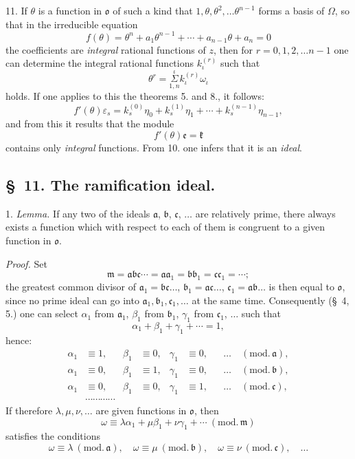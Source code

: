 \documentclass{article}
\begin{document}

11. If $\theta$ is a function in $\mathfrak{o}$ of such a kind that $1, \theta, \theta^{2}, \ldots \theta^{n-1}$ forms a basis of $\Omega$, so that in the irreducible equation
\[ f(\theta) = \theta^{n} + a_{1}\theta^{n-1} + \cdots + a_{n-1}\theta + a_{n} = 0 \]
the coefficients are \emph{integral} rational functions of $z$, then for $r = 0, 1, 2, \ldots n-1$ one can determine the integral rational functions $k_{\iota}^{(r)}$ such that
\[ \theta^{r} = \overset{\iota}{\underset{1,n}{\Sigma}} k_{\iota}^{(r)}\omega_{\iota} \]
holds. If one applies to this the theorems 5. and 8., it follows:
\[ f'(\theta)\varepsilon_{s} = k_{s}^{(0)}\eta_{0} + k_{s}^{(1)}\eta_{1} + \cdots + k_{s}^{(n-1)}\eta_{n-1}, \]
and from this it results that the module
\[ f'(\theta)\mathfrak{e} = \mathfrak{k} \]
contains only \emph{integral} functions. From 10. one infers that it is an \emph{ideal}.

\subsection*{§~11. The ramification ideal.}

1. \emph{Lemma.} If any two of the ideals $\mathfrak{a}$, $\mathfrak{b}$, $\mathfrak{c}$, $\ldots$ are relatively prime, there always exists a function which with respect to each of them is congruent to a given function in $\mathfrak{o}$.

\emph{Proof.} Set
\[ \mathfrak{m} = \mathfrak{a}\mathfrak{b}\mathfrak{c}\cdots = \mathfrak{a}\mathfrak{a}_{1} = \mathfrak{b}\mathfrak{b}_{1} = \mathfrak{c}\mathfrak{c}_{1} = \cdots; \]
the greatest common divisor of $\mathfrak{a}_{1} = \mathfrak{b}\mathfrak{c}\ldots$, $\mathfrak{b}_{1} = \mathfrak{a}\mathfrak{c}\ldots$, $\mathfrak{c}_{1} = \mathfrak{a}\mathfrak{b}\ldots$ is then equal to $\mathfrak{o}$, since no prime ideal can go into $\mathfrak{a}_{1}, \mathfrak{b}_{1}, \mathfrak{c}_{1}, \ldots$ at the same time. Consequently (§~4, 5.) one can select $\alpha_{1}$ from $\mathfrak{a}_{1}$, $\beta_{1}$ from $\mathfrak{b}_{1}$, $\gamma_{1}$ from $\mathfrak{c}_{1}$, $\ldots$ such that
\[ \alpha_{1} + \beta_{1} + \gamma_{1} + \cdots = 1, \]
hence:
\[ \begin{aligned} \alpha_{1} &\equiv 1, & \beta_{1} &\equiv 0, & \gamma_{1} &\equiv 0, & &\ldots \quad (\text{mod.}\,\mathfrak{a}), \\ \alpha_{1} &\equiv 0, & \beta_{1} &\equiv 1, & \gamma_{1} &\equiv 0, & &\ldots \quad (\text{mod.}\,\mathfrak{b}), \\ \alpha_{1} &\equiv 0, & \beta_{1} &\equiv 0, & \gamma_{1} &\equiv 1, & &\ldots \quad (\text{mod.}\,\mathfrak{c}), \\ &\cdots\cdots\cdots\cdots \end{aligned} \]
If therefore $\lambda, \mu, \nu, \ldots$ are given functions in $\mathfrak{o}$, then
\[ \omega \equiv \lambda\alpha_{1} + \mu\beta_{1} + \nu\gamma_{1} + \cdots \ (\text{mod.}\,\mathfrak{m}) \]
satisfies the conditions
\[ \omega \equiv \lambda \ (\text{mod.}\,\mathfrak{a}), \quad \omega \equiv \mu \ (\text{mod.}\,\mathfrak{b}), \quad \omega \equiv \nu \ (\text{mod.}\,\mathfrak{c}), \quad \ldots \]
\end{document}
